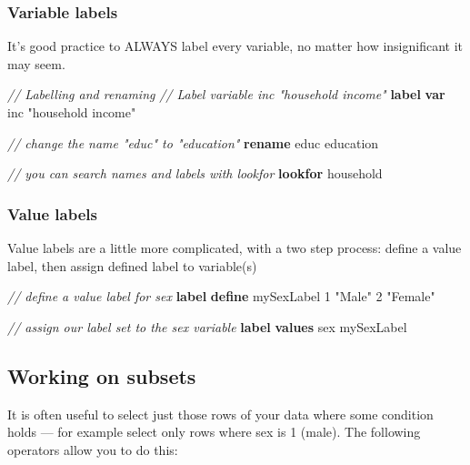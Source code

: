 \documentclass[
]{book}
\newenvironment{Shaded}{\begin{snugshade}}{\end{snugshade}}
\newcommand{\CommentTok}[1]{\textcolor[rgb]{0.56,0.35,0.01}{\textit{#1}}}
\newcommand{\KeywordTok}[1]{\textcolor[rgb]{0.13,0.29,0.53}{\textbf{#1}}}
\newcommand{\NormalTok}[1]{#1}
\newcommand{\StringTok}[1]{\textcolor[rgb]{0.31,0.60,0.02}{#1}}
\begin{document}
\hypertarget{variable-labels}{%
\subsubsection{Variable labels}\label{variable-labels}}

It's good practice to ALWAYS label every variable, no matter how insignificant it may seem.

\begin{Shaded}
\begin{Highlighting}[]
\CommentTok{// Labelling and renaming }
\CommentTok{// Label variable inc "household income"}
\KeywordTok{label} \KeywordTok{var}\NormalTok{ inc }\StringTok{"household income"}

\CommentTok{// change the name "educ" to "education"}
\KeywordTok{rename}\NormalTok{ educ education}

\CommentTok{// you can search names and labels with \textasciigrave{}lookfor\textasciigrave{}}
\KeywordTok{lookfor}\NormalTok{ household}
\end{Highlighting}
\end{Shaded}

\hypertarget{value-labels}{%
\subsubsection{Value labels}\label{value-labels}}

Value labels are a little more complicated, with a two step process: define a value label, then assign defined label to variable(s)

\begin{Shaded}
\begin{Highlighting}[]
\CommentTok{// define a value label for sex }
\KeywordTok{label} \KeywordTok{define}\NormalTok{ mySexLabel 1 }\StringTok{"Male"}\NormalTok{ 2 }\StringTok{"Female"}

\CommentTok{// assign our label set to the sex variable}
\KeywordTok{label} \KeywordTok{values}\NormalTok{ sex mySexLabel}
\end{Highlighting}
\end{Shaded}

\hypertarget{working-on-subsets}{%
\subsection{Working on subsets}\label{working-on-subsets}}

It is often useful to select just those rows of your data where some condition holds --- for example select only rows where sex is 1 (male). The following operators allow you to do this:
\end{document}
